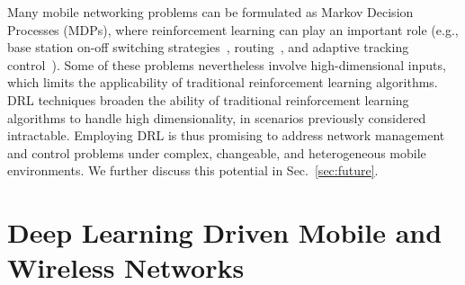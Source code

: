 \documentclass[journal,comsoc,letter]{IEEEtran}
\begin{document}
Many mobile networking problems can be formulated as Markov Decision Processes (MDPs), where reinforcement learning can play an important role (e.g., base station on-off switching strategies~\cite{li2014tact}, routing~\cite{al2015application}, and adaptive tracking control~\cite{liu2015reinforcement}). Some of these problems nevertheless involve high-dimensional inputs, which limits the applicability of traditional reinforcement learning algorithms. DRL techniques broaden the ability of traditional reinforcement learning algorithms to handle high dimensionality, in scenarios previously considered intractable. Employing DRL is thus promising to address network management and control problems under complex, changeable, and heterogeneous mobile environments. We further discuss this potential in Sec.~\ref{sec:future}.

\section{Deep Learning Driven Mobile and Wireless Networks}\label{sec:netapp}
\end{document}
